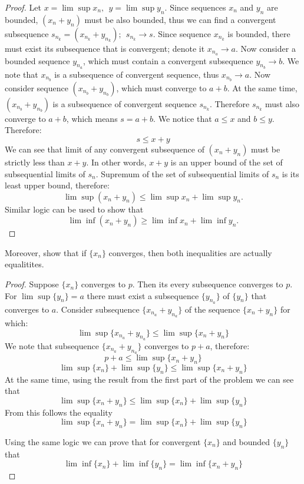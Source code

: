 \documentclass{article}
\begin{document}
\begin{proof}
Let $x = \lim \sup x_n, \>\> y = \lim \sup y_n$. Since sequences $x_n$ and $y_n$ are bounded, $(x_n+y_n)$ must be also bounded, thus we can find a convergent subsequence $s_{n_k} = (x_{n_k} + y_{n_k}); \>\> s_{n_k} \to s$. Since sequence $x_{n_k}$ is bounded, there must exist its subsequence that is convergent; denote it $x_{n_a} \to a$. Now consider a bounded sequence $y_{n_a}$, which must contain a convergent subsequence $y_{n_b} \to b$. We note that $x_{n_b}$ is a subsequence of convergent sequence, thus $x_{n_b} \to a$. Now consider sequence $(x_{n_b}+y_{n_b})$, which must converge to $a+b$. At the same time, $(x_{n_b}+y_{n_b})$ is a subsequence of convergent sequence $s_{n_k}$. Therefore $s_{n_k}$ must also converge to $a+b$, which means $s=a+b$. We notice that $a \leq x$ and $b \leq y$. Therefore:
$$ s \leq x + y $$
We can see that limit of any convergent subsequence of $(x_n+y_n)$ must be strictly less than $x+y$. In other words, $x+y$ is an upper bound of the set of subsequential limits of $s_n$. Supremum of the set of subsequential limits of $s_n$ is its least upper bound, therefore:
$$ \lim \sup (x_n + y_n) \leq \lim \sup x_n + \lim \sup y_n. $$
Similar logic can be used to show that
$$ \lim \inf (x_n + y_n) \geq \lim \inf x_n + \lim \inf y_n. $$

\end{proof}

\begin{tcolorbox}
Moreover, show that if $\{x_n\}$ converges, then both inequalities are actually equalitites.
\end{tcolorbox}
\begin{proof}
Suppose $\{x_n\}$ converges to $p$. Then its every subsequence converges to $p$. For $\lim \sup \{y_n\} = a$ there must exist a subsequence $\{y_{n_a}\}$ of $\{y_n\}$ that converges to $a$. Consider subsequence $\{ x_{n_a} + y_{n_a} \}$ of the sequence $\{ x_n + y_n \}$ for which:
$$ \lim \sup \{ x_{n_a} + y_{n_a} \} \leq \lim \sup \{ x_n + y_n \} $$
We note that  subsequence $\{ x_{n_a} + y_{n_a} \}$ converges to $p+a$, therefore:
$$ p + a \leq \lim \sup \{ x_n + y_n \} $$
$$ \lim \sup \{ x_n \} + \lim \sup \{y_n\} \leq \lim \sup \{ x_n + y_n \} $$
At the same time, using the result from the first part of the problem we can see that
$$ \lim \sup \{ x_n + y_n \} \leq \lim \sup \{ x_n \} + \lim \sup \{y_n\} $$
From this follows the equality
$$ \lim \sup \{ x_n + y_n \} = \lim \sup \{ x_n \} + \lim \sup \{y_n\} $$

Using the same logic we can prove that for convergent $\{ x_n \}$ and bounded $\{ y_n \}$ that
$$ \lim \inf \{ x_n \} + \lim \inf \{ y_n \} = \lim \inf \{ x_n + y_n\} $$
\end{proof}
\end{document}
